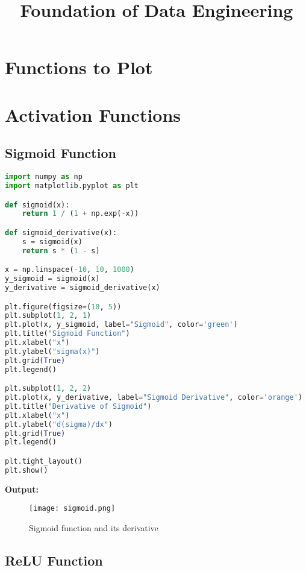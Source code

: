 \documentclass[11pt]{article}
\title{Foundation of Data Engineering}
\author{}
\date{}
\begin{document}
\maketitle

\section*{Functions to Plot}

\section{Activation Functions}

\subsection{Sigmoid Function}

\begin{lstlisting}[language=Python, caption={Sigmoid function and its derivative}]
import numpy as np
import matplotlib.pyplot as plt

def sigmoid(x):
    return 1 / (1 + np.exp(-x))

def sigmoid_derivative(x):
    s = sigmoid(x)
    return s * (1 - s)

x = np.linspace(-10, 10, 1000)
y_sigmoid = sigmoid(x)
y_derivative = sigmoid_derivative(x)

plt.figure(figsize=(10, 5))
plt.subplot(1, 2, 1)
plt.plot(x, y_sigmoid, label="Sigmoid", color='green')
plt.title("Sigmoid Function")
plt.xlabel("x")
plt.ylabel("sigma(x)")
plt.grid(True)
plt.legend()

plt.subplot(1, 2, 2)
plt.plot(x, y_derivative, label="Sigmoid Derivative", color='orange')
plt.title("Derivative of Sigmoid")
plt.xlabel("x")
plt.ylabel("d(sigma)/dx")
plt.grid(True)
plt.legend()

plt.tight_layout()
plt.show()
\end{lstlisting}

\noindent\textbf{Output:}
\begin{figure}[H]
    \centering
    \texttt{[image: sigmoid.png]}
    \caption{Sigmoid function and its derivative}
\end{figure}

\subsection{ReLU Function}
\end{document}
